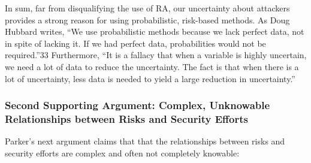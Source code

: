 In sum, far from disqualifying the use of RA, our uncertainty about
attackers provides a strong reason for using probabilistic, risk-based
methods. As Doug Hubbard writes, ``We use probabilistic methods because
we lack perfect data, not in spite of lacking it. If we had perfect
data, probabilities would not be required.''33 Furthermore, ``It is a
fallacy that when a variable is highly uncertain, we need a lot of data
to reduce the uncertainty. The fact is that when there is a lot of
uncertainty, less data is needed to yield a large reduction in
uncertainty.''

\subsubsection{Second Supporting Argument: Complex, Unknowable
Relationships between Risks and Security
Efforts}\label{second-supporting-argument-complex-unknowable-relationships-between-risks-and-security-efforts}

Parker's next argument claims that that the relationships between risks
and security efforts are complex and often not completely knowable:
